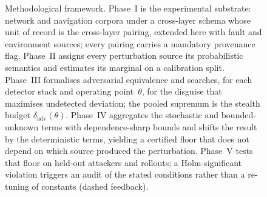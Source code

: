 \begin{figure}[t]
{}
\caption{Methodological framework. Phase~I is the experimental substrate: network
and navigation corpora under a cross-layer schema whose unit of record is the
cross-layer pairing, extended here with fault and environment sources; every
pairing carries a mandatory provenance flag. Phase~II assigns every
perturbation source its probabilistic semantics and estimates its marginal on a
calibration split. Phase~III formalises adversarial equivalence and searches,
for each detector stack and operating point~$\theta$, for the disguise that
maximises undetected deviation; the pooled supremum is the stealth budget
$\delta_{\mathrm{adv}}(\theta)$. Phase~IV aggregates the stochastic and
bounded-unknown terms with dependence-sharp bounds and shifts the result by the
deterministic terms, yielding a certified floor that does not depend on which
source produced the perturbation. Phase~V tests that floor on held-out attackers
and rollouts; a Holm-significant violation triggers an audit of the stated
conditions rather than a re-tuning of constants (dashed feedback).}
\label{fig:framework}
\end{figure}
